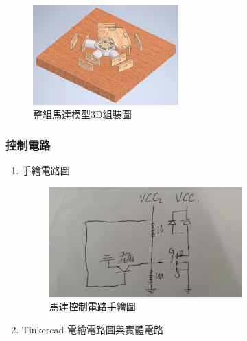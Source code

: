 \documentclass[12pt,a4paper]{article}
\begin{document}
\begin{CJK*}{UTF8}{bkai}
\begin{enumerate}
\begin{figure}[h]
                  \centering
                  \includegraphics[width=0.5\textwidth]{./images/all_3d.png}
                  \caption{整組馬達模型3D組裝圖}
              \end{figure}
    \end{enumerate}

    \subsubsection{控制電路}
    \begin{enumerate}
        \item 手繪電路圖
              \begin{figure}[H]
                  \centering
                  \includegraphics[width=0.7\textwidth]{./images/circuit_draft.png}
                  \caption{馬達控制電路手繪圖}
              \end{figure}
              \newpage
        \item Tinkercad 電繪電路圖與實體電路
              \begin{figure}[h]
                  \centering

\end{figure}
\end{enumerate}
\end{CJK*}
\end{document}
